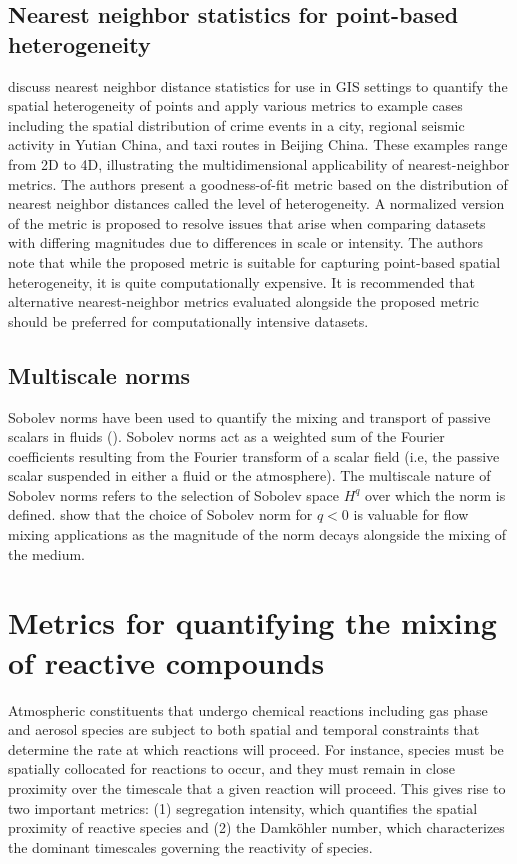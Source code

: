 \subsection{Nearest neighbor statistics for point-based heterogeneity}
\cite{shu_quantifying_2019} discuss nearest neighbor distance statistics for use in GIS settings to quantify the spatial heterogeneity of points and apply various metrics to example cases including the spatial distribution of crime events in a city, regional seismic activity in Yutian China, and taxi routes in Beijing China. These examples range from 2D to 4D, illustrating the multidimensional applicability of nearest-neighbor metrics. The authors present a goodness-of-fit metric based on the distribution of nearest neighbor distances called the level of heterogeneity. A normalized version of the metric is proposed to resolve issues that arise when comparing datasets with differing magnitudes due to differences in scale or intensity. The authors note that while the proposed metric is suitable for capturing point-based spatial heterogeneity, it is quite computationally expensive. It is recommended that alternative nearest-neighbor metrics evaluated alongside the proposed metric should be preferred for computationally intensive datasets. 

\subsection{Multiscale norms}
Sobolev norms have been used to quantify the mixing and transport of passive scalars in fluids (\cite{thiffeault_using_2012}). Sobolev norms act as a weighted sum of the Fourier coefficients resulting from the Fourier transform of a scalar field (i.e, the passive scalar suspended in either a fluid or the atmosphere). The multiscale nature of Sobolev norms refers to the selection of Sobolev space $H^q$ over which the norm is defined. \cite{thiffeault_using_2012} show that the choice of Sobolev norm for $q<0$ is valuable for flow mixing applications as the magnitude of the norm decays alongside the mixing of the medium.

\section{Metrics for quantifying the mixing of reactive compounds}\label{metrics-reactive-mixing}
Atmospheric constituents that undergo chemical reactions including gas phase and aerosol species are subject to both spatial and temporal constraints that determine the rate at which reactions will proceed. For instance, species must be spatially collocated for reactions to occur, and they must remain in close proximity over the timescale that a given reaction will proceed. This gives rise to two important metrics: (1) segregation intensity, which quantifies the spatial proximity of reactive species and (2) the Damköhler number, which characterizes the dominant timescales governing the reactivity of species.

